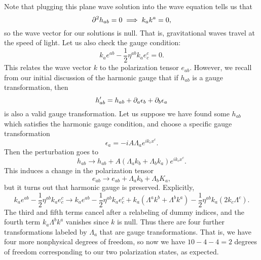 Note that plugging this plane wave solution into the wave equation tells us that
$$\partial^2 h_{ab}=0 \implies k_a k^a =0,$$
so the wave vector for our solutions is null. That is, gravitational waves travel at the speed of light. Let us also check the gauge condition:
\begin{equation}\label{polarizationgauge}
    k_a e^{ab}-\frac{1}{2}\eta^{ab}k_a e^c_c =0.
\end{equation}
This relates the wave vector $k$ to the polarization tensor $e_{ab}$. However, we recall from our initial discussion of the harmonic gauge that if $h_{ab}$ is a gauge transformation, then
$$h_{ab}'= h_{ab}+\partial_a \epsilon_b +\partial_b \epsilon_a$$
is also a valid gauge transformation.
Let us suppose we have found some $h_{ab}$ which satisfies the harmonic gauge condition, and choose a specific gauge transformation
$$\epsilon_a=-i A \Lambda_a e^{ik_c x^c}.$$
Then the perturbation goes to
$$h_{ab}\to h_{ab}+A(\Lambda_a k_b +\Lambda_b k_a)e^{ik_c x^c}.$$
This induces a change in the polarization tensor
$$e_{ab}\to e_{ab}+\Lambda_a k_b +\Lambda_b K_a,$$
but it turns out that harmonic gauge is preserved. Explicitly,
$$k_a e^{ab}-\frac{1}{2}\eta^{ab}k_a e^c_c \to k_a e^{ab}-\frac{1}{2} \eta^{ab} k_a e^c_c +k_a (\Lambda^a k^b + \Lambda^b k^a)-\frac{1}{2} \eta^{ab}k_a (2k_c \Lambda^c).$$
The third and fifth terms cancel after a relabeling of dummy indices, and the fourth term $k_a \Lambda^b k^a$ vanishes since $k$ is null. Thus there are four further transformations labeled by $\Lambda_a$ that are gauge transformations. That is, we have four more nonphysical degrees of freedom, so now we have $10-4-4=2$ degrees of freedom corresponding to our two polarization states, as expected.

